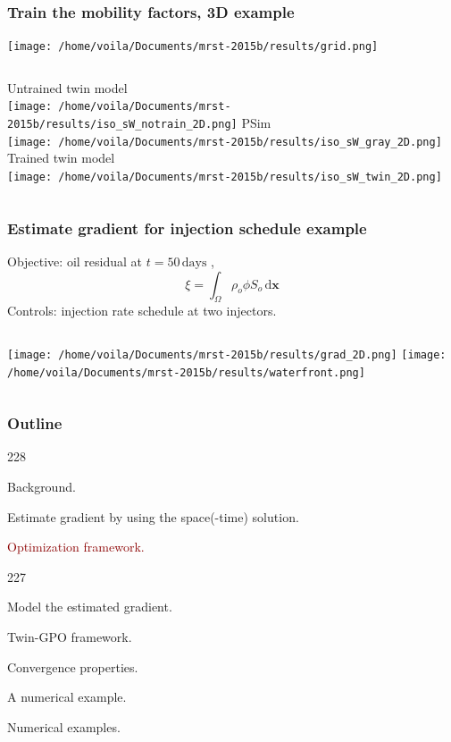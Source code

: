 \documentclass{beamer}
\newcommand{\barrow}{\item[\color{darkred}\ding{228}]}
\newcommand{\carrow}{\item[\color{darkred}\ding{227}]}
\begin{document}
\begin{frame}
    \frametitle{Train the mobility factors, 3D \hfill \scriptsize{example}}\scriptsize
    \begin{center}
        \texttt{[image: /home/voila/Documents/mrst-2015b/results/grid.png]}
    \end{center}
    \centering
    \begin{columns}
        \centering
        Untrained twin model\\
        \texttt{[image: /home/voila/Documents/mrst-2015b/results/iso\_sW\_notrain\_2D.png]}
        \centering
        PSim\\
        \texttt{[image: /home/voila/Documents/mrst-2015b/results/iso\_sW\_gray\_2D.png]}
        \centering
        Trained twin model\\
        \texttt{[image: /home/voila/Documents/mrst-2015b/results/iso\_sW\_twin\_2D.png]}
    \end{columns}
\end{frame}

\begin{frame}
    \frametitle{Estimate gradient for injection schedule \hfill\scriptsize{example}}\small
    Objective: oil residual at $t=50\, \textrm{days}$ , $$\xi = \int_\Omega \rho_o \phi S_o \,\textrm{d} \boldsymbol{x} $$
    Controls: injection rate schedule at two injectors.
    \begin{columns}
        \centering
        \vspace{.1cm}
        \texttt{[image: /home/voila/Documents/mrst-2015b/results/grad\_2D.png]}
        \centering
        \texttt{[image: /home/voila/Documents/mrst-2015b/results/waterfront.png]}
    \end{columns}
\end{frame}


\setcounter{framenumber}{30}
\begin{frame}
    \frametitle{Outline}\small
    \begin{dinglist}{228}
        \barrow {}Background.
        \barrow Estimate gradient by using the space(-time) solution.
        \barrow \textcolor{darkred}{Optimization framework.}
        \begin{dinglist}{227}
            \carrow Model the estimated gradient.
            \carrow Twin-GPO framework.
            \carrow Convergence properties.
            \carrow A numerical example.
        \end{dinglist}
        \barrow Numerical examples.
    \end{dinglist}
\end{frame}
\end{document}
